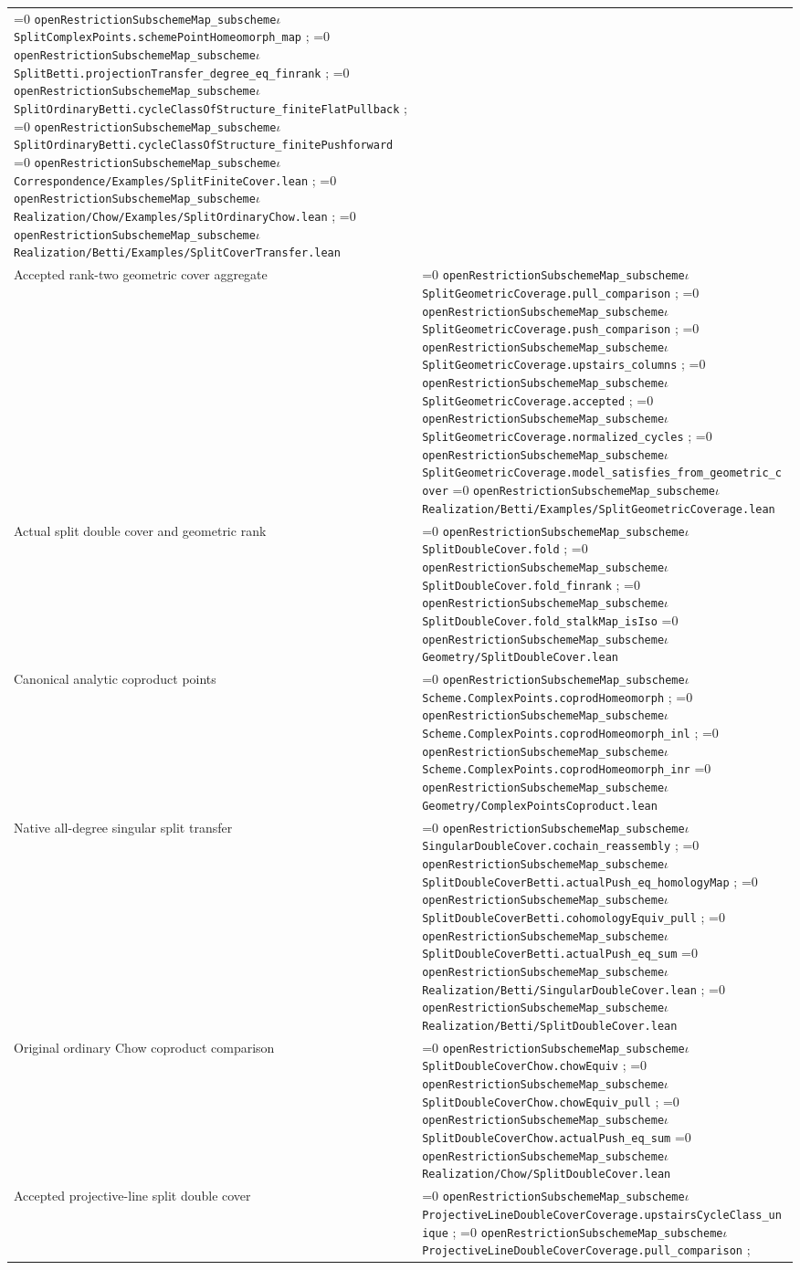 \documentclass[11pt]{article}
\theoremstyle{definition}
\theoremstyle{remark}
\newcommand{\leanpath}[1]{%
  \ifnum\pdfstrcmp{\detokenize{#1}}%
      {\detokenize{openRestrictionSubschemeMap_subschemeι}}=0
    \texttt{\nolinkurl{openRestrictionSubschemeMap_subscheme}}\ensuremath{\iota}%
  \else
    \texttt{\nolinkurl{#1}}%
  \fi}
\begin{document}
\begin{longtable}{@{}>{\raggedright\arraybackslash}p{}
                >{\raggedright\arraybackslash}p{}@{}}
\leanpath{SplitComplexPoints.schemePointHomeomorph_map};
\leanpath{SplitBetti.projectionTransfer_degree_eq_finrank};
\leanpath{SplitOrdinaryBetti.cycleClassOfStructure_finiteFlatPullback};
\leanpath{SplitOrdinaryBetti.cycleClassOfStructure_finitePushforward}\newline
\leanpath{Correspondence/Examples/SplitFiniteCover.lean};
\leanpath{Realization/Chow/Examples/SplitOrdinaryChow.lean};
\leanpath{Realization/Betti/Examples/SplitCoverTransfer.lean}\\
Accepted rank-two geometric cover aggregate &
\leanpath{SplitGeometricCoverage.pull_comparison};
\leanpath{SplitGeometricCoverage.push_comparison};
\leanpath{SplitGeometricCoverage.upstairs_columns};
\leanpath{SplitGeometricCoverage.accepted};
\leanpath{SplitGeometricCoverage.normalized_cycles};
\leanpath{SplitGeometricCoverage.model_satisfies_from_geometric_cover}\newline
\leanpath{Realization/Betti/Examples/SplitGeometricCoverage.lean}\\
Actual split double cover and geometric rank &
\leanpath{SplitDoubleCover.fold};
\leanpath{SplitDoubleCover.fold_finrank};
\leanpath{SplitDoubleCover.fold_stalkMap_isIso}\newline
\leanpath{Geometry/SplitDoubleCover.lean}\\
Canonical analytic coproduct points &
\leanpath{Scheme.ComplexPoints.coprodHomeomorph};
\leanpath{Scheme.ComplexPoints.coprodHomeomorph_inl};
\leanpath{Scheme.ComplexPoints.coprodHomeomorph_inr}\newline
\leanpath{Geometry/ComplexPointsCoproduct.lean}\\
Native all-degree singular split transfer &
\leanpath{SingularDoubleCover.cochain_reassembly};
\leanpath{SplitDoubleCoverBetti.actualPush_eq_homologyMap};
\leanpath{SplitDoubleCoverBetti.cohomologyEquiv_pull};
\leanpath{SplitDoubleCoverBetti.actualPush_eq_sum}\newline
\leanpath{Realization/Betti/SingularDoubleCover.lean};
\leanpath{Realization/Betti/SplitDoubleCover.lean}\\
Original ordinary Chow coproduct comparison &
\leanpath{SplitDoubleCoverChow.chowEquiv};
\leanpath{SplitDoubleCoverChow.chowEquiv_pull};
\leanpath{SplitDoubleCoverChow.actualPush_eq_sum}\newline
\leanpath{Realization/Chow/SplitDoubleCover.lean}\\
Accepted projective-line split double cover &
\leanpath{ProjectiveLineDoubleCoverCoverage.upstairsCycleClass_unique};
\leanpath{ProjectiveLineDoubleCoverCoverage.pull_comparison};

\end{longtable}
\end{document}
